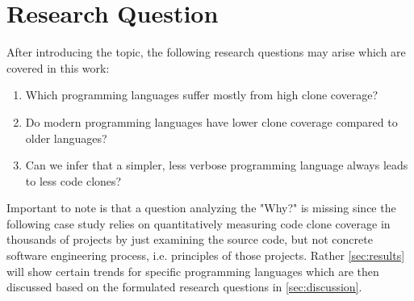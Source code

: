 
\section{Research Question}
\label{sec:research_question}

After introducing the topic, the following research questions may arise which are covered in this work:

\begin{enumerate}
	\item Which programming languages suffer mostly from high clone coverage?
	\item Do modern programming languages have lower clone coverage compared to older languages?
	\item Can we infer that a simpler, less verbose programming language always leads to less code clones?
\end{enumerate}

Important to note is that a question analyzing the "Why?" is missing since the following case study relies on quantitatively measuring code clone coverage in thousands of projects by just examining the source code, but not concrete software engineering process, i.e. principles of those projects. Rather \autoref{sec:results} will show certain trends for specific programming languages which are then discussed based on the formulated research questions in \autoref{sec:discussion}.